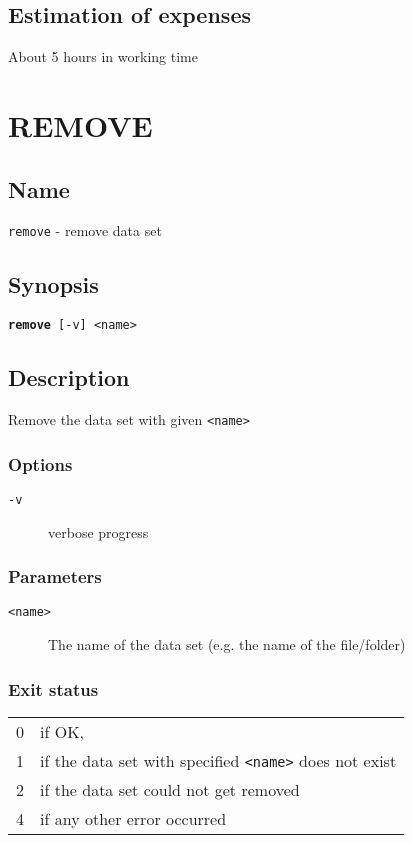 \documentclass{article} %
\begin{document}
		\subsection{Estimation of expenses}
		About 5 hours in working time
		
		\newpage
		\section*{REMOVE}
		\subsection*{Name}
		\texttt{remove} - remove data set
		\subsection*{Synopsis}
		\texttt{\textbf{remove} [-v] <name>}
		\subsection*{Description}
		Remove the data set with given \texttt{<name>}\\
		
		\noindent
		\subsubsection*{Options}
		\begin{description}
			\item[\texttt{-v}] verbose progress
		\end{description}
		
		\subsubsection*{Parameters}
		\begin{description}
			\item[\texttt{<name>}] The name of the data set (e.g. the name of the file/folder)
		\end{description}
		\subsubsection*{Exit status}
		\begin{tabular}{ll}
			0 &  if OK,\\ 
			1 &  if the data set with specified \texttt{<name>} does not exist\\ 
			2 &  if the data set could not get removed\\
			4 &  if any other error occurred\\
		\end{tabular}
\end{document}
